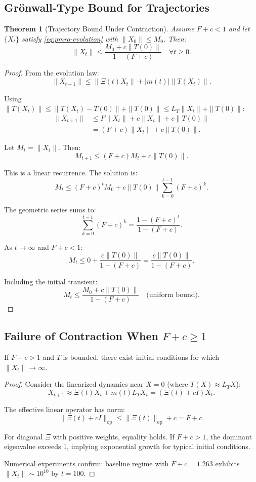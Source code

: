 \documentclass[11pt,a4paper]{article}
\newtheorem{theorem}{Theorem}
\begin{document}
\subsection{Grönwall-Type Bound for Trajectories}

\begin{theorem}[Trajectory Bound Under Contraction]
\label{thm:gronwall}
Assume \(F + c < 1\) and let \(\{X_t\}\) satisfy \eqref{eq:pmro-evolution} with \(\|X_0\| \leq M_0\). Then:
\[
\|X_t\| \leq \frac{M_0 + c \|T(0)\|}{1 - (F+c)} \quad \forall t \geq 0.
\]
\end{theorem}

\begin{proof}
From the evolution law:
\[
\|X_{t+1}\| \leq \|\Xi(t)X_t\| + |m(t)| \|T(X_t)\|.
\]

Using \(\|T(X_t)\| \leq \|T(X_t) - T(0)\| + \|T(0)\| \leq L_T \|X_t\| + \|T(0)\|\):
\begin{align*}
\|X_{t+1}\| 
&\leq F \|X_t\| + c \|X_t\| + c \|T(0)\| \\
&= (F+c) \|X_t\| + c \|T(0)\|.
\end{align*}

Let \(M_t = \|X_t\|\). Then:
\[
M_{t+1} \leq (F+c) M_t + c \|T(0)\|.
\]

This is a linear recurrence. The solution is:
\[
M_t \leq (F+c)^t M_0 + c \|T(0)\| \sum_{k=0}^{t-1} (F+c)^k.
\]

The geometric series sums to:
\[
\sum_{k=0}^{t-1} (F+c)^k = \frac{1 - (F+c)^t}{1 - (F+c)}.
\]

As \(t \to \infty\) and \(F+c < 1\):
\[
M_t \leq 0 + \frac{c \|T(0)\|}{1 - (F+c)} = \frac{c \|T(0)\|}{1 - (F+c)}.
\]

Including the initial transient:
\[
M_t \leq \frac{M_0 + c \|T(0)\|}{1 - (F+c)} \quad \text{(uniform bound)}.
\]
\end{proof}

\subsection{Failure of Contraction When \(F+c \geq 1\)}

\begin{proposition}
If \(F + c > 1\) and \(T\) is bounded, there exist initial conditions for which \(\|X_t\| \to \infty\).
\end{proposition}

\begin{proof}
Consider the linearized dynamics near \(X=0\) (where \(T(X) \approx L_T X\)):
\[
X_{t+1} \approx \Xi(t) X_t + m(t) L_T X_t = (\Xi(t) + c I) X_t.
\]

The effective linear operator has norm:
\[
\|\Xi(t) + cI\|_{\mathrm{op}} \leq \|\Xi(t)\|_{\mathrm{op}} + c = F + c.
\]

For diagonal \(\Xi\) with positive weights, equality holds. If \(F+c > 1\), the dominant eigenvalue exceeds 1, implying exponential growth for typical initial conditions.

Numerical experiments confirm: baseline regime with \(F+c = 1.263\) exhibits \(\|X_t\| \sim 10^{10}\) by \(t=100\).
\end{proof}
\end{document}
